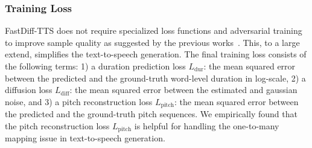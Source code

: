\subsubsection{Training Loss}
FastDiff-TTS does not require specialized loss functions and adversarial training to improve sample quality as suggested by the previous works~\cite{ren2020fastspeech,donahue2020end,kim2021conditional}. This, to a large extend, simplifies the text-to-speech generation. The final training loss consists of the following terms: 1) a duration prediction loss $L_\text{dur}$: the mean squared error between the predicted and the ground-truth word-level duration in log-scale, 2) a diffusion loss $L_\text{diff}$: the mean squared error between the estimated and gaussian noise, and 3) a pitch reconstruction loss $L_\text{pitch}$: the mean squared error between the predicted and the ground-truth pitch sequences. We empirically found that the pitch reconstruction loss $L_\text{pitch}$ is helpful for handling the one-to-many mapping issue in text-to-speech generation. 
